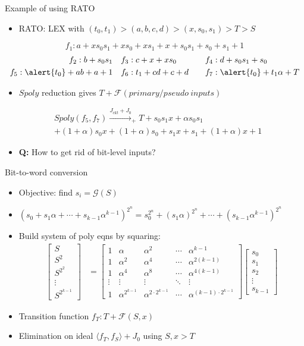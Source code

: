 \documentclass[xcolor=dvipsnames]{beamer}
\newcommand{\bi}{\begin{itemize}}
\newcommand{\ei}{\end{itemize}}
\newcommand{\Func}{{\mathcal{F}}}
\begin{document}
\begin{frame}{\large{Example of using RATO}}
\bi
\item RATO: LEX with $(t_0,t_1)>(a,b,c,d)>(x,s_0,s_1)>T>S$
\ei
\begin{equation*}
f_1: a+xs_0s_1+xs_0+xs_1+x+s_0s_1+s_0+s_1+1
\end{equation*}
\vspace{-0.8cm}
\begin{alignat*}{2}
f_2: b+s_0s_1 &~~~ f_3: c+x+xs_0 &&~~~f_4: d+s_0s_1+s_0 \\
f_5: \alert{t_0}+ab+a+1 &~~~ f_6: t_1+cd+c+d &&~~~ f_7: \alert{t_0}+t_1\alpha+T 
\end{alignat*}
\bi
\item $Spoly$ reduction gives $T+\Func(primary/pseudo~inputs)$
\ei
\begin{align}
&Spoly(f_5,f_7) \xrightarrow{J_{ckt}+J_0}_{+}T + s_0 s_1 x+\alpha s_0 s_1 \nonumber\\
&+(1+\alpha)s_0 x+(1+\alpha) s_0+s_1 x+s_1+(1+\alpha) x+1\nonumber
\end{align}
\bi
\item {\bf Q:} How to get rid of bit-level inputs?
\ei
\end{frame}
\begin{frame}{\large{Bit-to-word conversion}}
\bi
\item Objective: find $s_i = \mathcal G(S)$
\item $(s_0+s_1\alpha+\cdots+s_{k-1}\alpha^{k-1})^{2^n} = s_0^{2^n}+(s_1\alpha)^{2^n}+\cdots+(s_{k-1}\alpha^{k-1})^{2^n}$
\item Build system of poly eqns by squaring:
\begin{align*}
\label{eqn:alphamat}
\begin{bmatrix}
S \\
S^2 \\
S^{2^2} \\
\vdots \\
S^{2^{k-1}}
\end{bmatrix}
&=
\begin{bmatrix}
1 & \alpha & \alpha^{2} & \cdots & \alpha^{{k-1}}\\
1 & \alpha^{2} & \alpha^{4} & \cdots & \alpha^{2(k-1)} \\
1 & \alpha^{4} & \alpha^{8} & \cdots & \alpha^{4(k-1)}\\
\vdots & \vdots & \vdots & \ddots & \vdots \\
1 & \alpha^{2^{k-1}} & \alpha^{2\cdot 2^{k-1}} & \cdots & \alpha^{(k-1)\cdot 2^{k-1}}
\end{bmatrix}
\begin{bmatrix}
s_0\\
s_1\\
s_2\\
\vdots\\
s_{k-1}
\end{bmatrix}
\end{align*}
\item Transition function $f_T: T+\Func(S,x)$
\item Elimination on ideal $\langle f_T,f_S \rangle+J_0$ using $S,x > T$
\ei
\end{frame}
\end{document}
